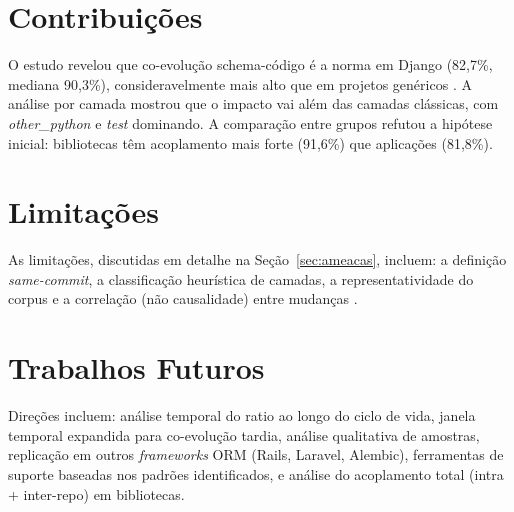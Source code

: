 \documentclass[
  12pt,
  openright,
  oneside,
  a4paper,
  brazil
]{abntex2}
\begin{document}
\section{Contribuições}

O estudo revelou que co-evolução schema-código é a norma em Django (82,7\%, mediana 90,3\%), consideravelmente mais alto que em projetos genéricos \cite{vassiliadis2023}. A análise por camada mostrou que o impacto vai além das camadas clássicas, com \textit{other\_python} e \textit{test} dominando. A comparação entre grupos refutou a hipótese inicial: bibliotecas têm acoplamento mais forte (91,6\%) que aplicações (81,8\%).

\section{Limitações}

As limitações, discutidas em detalhe na Seção~\ref{sec:ameacas}, incluem: a definição \textit{same-commit}, a classificação heurística de camadas, a representatividade do corpus e a correlação (não causalidade) entre mudanças \cite{qiu2013}.

\section{Trabalhos Futuros}

Direções incluem: análise temporal do ratio ao longo do ciclo de vida, janela temporal expandida para co-evolução tardia, análise qualitativa de amostras, replicação em outros \textit{frameworks} ORM (Rails, Laravel, Alembic), ferramentas de suporte baseadas nos padrões identificados, e análise do acoplamento total (intra + inter-repo) em bibliotecas.


\postextual


\end{document}
